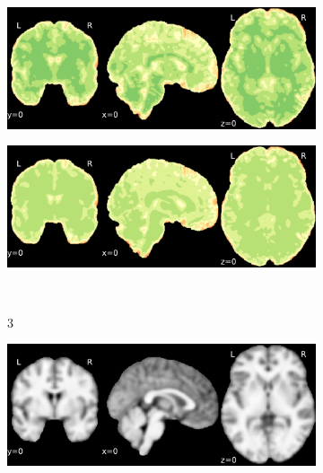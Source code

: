 \documentclass{article}
\begin{document}
\begin{landscape}
\begin{figure}
\begin{subfigure}[t]{0.2\paperheight}
        \end{subfigure}
        \begin{subfigure}[t]{0.2\paperheight}
            \centering
            \includegraphics[width=\textwidth]{figures/sig/fwhm_5/rs_ds001771_sub-36_sig.pdf}
        \end{subfigure}
        \begin{subfigure}[t]{0.2\paperheight}
            \centering
            \includegraphics[width=\textwidth]{figures/sig/fwhm_5/rr.rs_ds001771_sub-36_sig.pdf}
        \end{subfigure} \\
        \begin{subfigure}[b][][c]{0.01\paperwidth} 3 \vspace*{15pt} \end{subfigure}
        \begin{subfigure}[t]{0.2\paperheight}
            \centering
            \includegraphics[width=\textwidth]{figures/ieee_T1/fwhm_5/ieee_ds000256_sub-CTS201.pdf}

\end{subfigure}
\end{figure}
\end{landscape}
\end{document}
